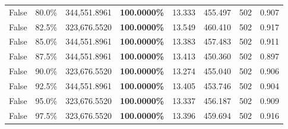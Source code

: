 \begin{table}[H]
\begin{tabular}{lllrllll}
\cline{1-8}
False & 80.0\% & 344,551.8961 & \bfseries \color{red} 100.0000\% & 13.333 & 455.497 & 502 & 0.907 \\
\cline{1-8}
False & 82.5\% & 323,676.5520 & \bfseries \color{red} 100.0000\% & 13.549 & 460.410 & 502 & 0.917 \\
\cline{1-8}
False & 85.0\% & 344,551.8961 & \bfseries \color{red} 100.0000\% & 13.383 & 457.483 & 502 & 0.911 \\
\cline{1-8}
False & 87.5\% & 344,551.8961 & \bfseries \color{red} 100.0000\% & 13.413 & 450.360 & 502 & 0.897 \\
\cline{1-8}
False & 90.0\% & 323,676.5520 & \bfseries \color{red} 100.0000\% & 13.274 & 455.040 & 502 & 0.906 \\
\cline{1-8}
False & 92.5\% & 344,551.8961 & \bfseries \color{red} 100.0000\% & 13.405 & 453.746 & 502 & 0.904 \\
\cline{1-8}
False & 95.0\% & 323,676.5520 & \bfseries \color{red} 100.0000\% & 13.337 & 456.187 & 502 & 0.909 \\
\cline{1-8}
False & 97.5\% & 323,676.5520 & \bfseries \color{red} 100.0000\% & 13.396 & 459.694 & 502 & 0.916 \\
\cline{1-8}
\bottomrule
\end{tabular}
\end{table}
